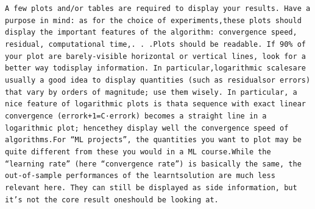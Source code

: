 \texttt{A few plots and/or tables are required to display your results. Have a purpose in mind: as for the choice of experiments,these plots should display the important features of the algorithm: convergence speed, residual, computational time,. . .Plots should be readable. If 90\% of your plot are barely-visible horizontal or vertical lines, look for a better way todisplay information. In particular,logarithmic scalesare usually a good idea to display quantities (such as residualsor errors) that vary by orders of magnitude; use them wisely. In particular, a nice feature of logarithmic plots is thata sequence with exact linear convergence (errork+1=C·errork) becomes a straight line in a logarithmic plot; hencethey display well the convergence speed of algorithms.For “ML projects”, the quantities you want to plot may be quite different from these you would in a ML course.While the “learning rate” (here “convergence rate”) is basically the same, the out-of-sample performances of the learntsolution are much less relevant here. They can still be displayed as side information, but it’s not the core result oneshould be looking at.}